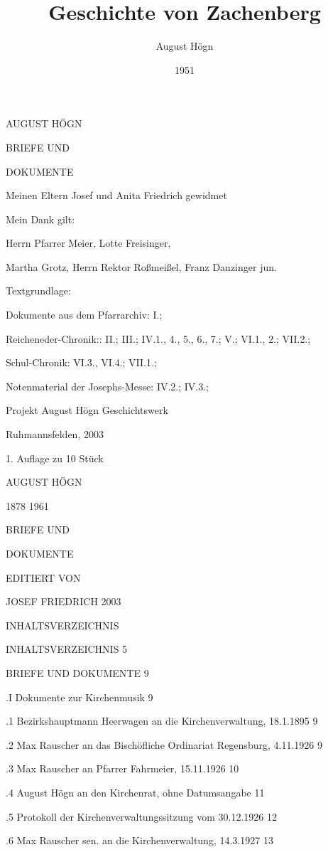 \documentclass[12pt,a4paper]{book}
\author{August Högn}
\title{Geschichte von Zachenberg}
\date{1951}
\begin{document}
\maketitle


AUGUST HÖGN

BRIEFE UND

DOKUMENTE

Meinen Eltern Josef und Anita Friedrich gewidmet


Mein Dank gilt:

Herrn Pfarrer Meier, Lotte Freisinger,

Martha Grotz, Herrn Rektor Roßmeißel, Franz Danzinger jun.



Textgrundlage:

Dokumente aus dem Pfarrarchiv: I.;

Reicheneder-Chronik:: II.; III.; IV.1., 4., 5.,  6.,  7.; V.; VI.1., 2.; VII.2.;

Schul-Chronik: VI.3., VI.4.; VII.1.;

Notenmaterial der Josephs-Messe: IV.2.; IV.3.;


Projekt August Högn Geschichtswerk

Ruhmannsfelden, 2003

1. Auflage zu 10 Stück

AUGUST HÖGN

1878 1961


BRIEFE UND

DOKUMENTE

EDITIERT VON

JOSEF FRIEDRICH 2003





INHALTSVERZEICHNIS

INHALTSVERZEICHNIS  5

BRIEFE UND DOKUMENTE    9

.I Dokumente zur Kirchenmusik   9

.1 Bezirkshauptmann Heerwagen an die Kirchenverwaltung, 18.1.1895   9

.2 Max Rauscher an das Bischöfliche Ordinariat Regensburg, 4.11.1926    9

.3 Max Rauscher an Pfarrer Fahrmeier, 15.11.1926    10

.4 August Högn an den Kirchenrat, ohne Datumsangabe 11

.5 Protokoll der Kirchenverwaltungssitzung vom 30.12.1926   12

.6 Max Rauscher sen. an die Kirchenverwaltung, 14.3.1927    13
\end{document}
